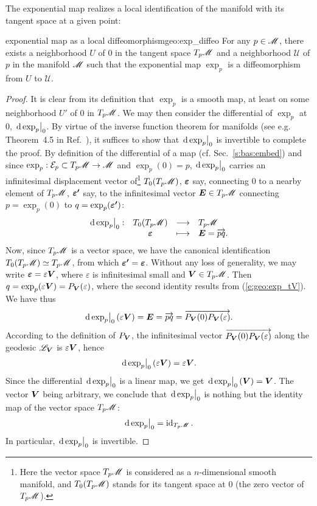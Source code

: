 The exponential map realizes a local identification of the manifold
with its tangent space at a given point:
\begin{tprop}{exponential map as a local diffeomorphism}{geo:exp_diffeo}
For any $p\in\mathscr{M}$, there exists a neighborhood $U$ of $0$ in the tangent
space $T_p\mathscr{M}$ and a neighborhood $\mathscr{U}$ of $p$ in the manifold $\mathscr{M}$
such that the exponential map $\exp_p$ is a diffeomorphism from
$U$ to $\mathscr{U}$.
\end{tprop}

\begin{proof}
It is clear from its definition that $\exp_p$ is a smooth map, at least
on some neighborhood $U'$ of $0$ in $T_p\mathscr{M}$. We may then consider the
differential of $\exp_p$ at $0$, $\left.\mathrm{d}\exp_p\right| _0$.
By virtue of the inverse function theorem for manifolds (see e.g. Theorem~4.5 in
Ref.~\cite{Lee13}), it suffices to show that
$\left.\mathrm{d}\exp_p\right| _0$ is invertible to complete the proof.
By definition of the differential of a map (cf. Sec.~\ref{s:bas:embed})
and since $\exp_p: \mathcal{E}_p \subset T_p\mathscr{M} \to \mathscr{M}$
and $\exp_p(0) = p$, $\left.\mathrm{d}\exp_p\right| _0$ carries an
infinitesimal displacement vector of\footnote{Here the vector space $T_p\mathscr{M}$ is considered
as a $n$-dimensional smooth manifold, and $T_0(T_p\mathscr{M})$ stands for its tangent space
at $0$ (the zero vector of $T_p\mathscr{M}$).} $T_0(T_p\mathscr{M})$, $\bm{\varepsilon}$ say, connecting $0$ to a nearby element of $T_p\mathscr{M}$, $\bm{\varepsilon'}$ say,
to the infinitesimal vector $\bm{E}\in T_p\mathscr{M}$ connecting
$p=\exp_p(0)$ to $q=\exp_p(\bm{\varepsilon'})$:
\[
    \begin{array}{cccl}
    \left.\mathrm{d}\exp_p\right| _0: & T_0(T_p\mathscr{M}) & \longrightarrow & T_p\mathscr{M} \\
        & \bm{\varepsilon} & \longmapsto & \bm{E} = \overrightarrow{pq}.
    \end{array}
\]
Now, since $T_p\mathscr{M}$ is a vector space, we have the canonical identification
$T_0(T_p\mathscr{M}) \simeq T_p\mathscr{M}$, from which $\bm{\varepsilon'} = \bm{\varepsilon}$.
Without any loss of generality, we may write $\bm{\varepsilon} = \varepsilon \bm{V}$,
where $\varepsilon$ is infinitesimal small and $\bm{V}\in T_p\mathscr{M}$. Then
$q = \exp_p(\varepsilon \bm{V}) = P_{\bm{V}}(\varepsilon)$, where the second
identity results from (\ref{e:geo:exp_tV}). We have thus
\[
    \left.\mathrm{d}\exp_p\right| _0(\varepsilon \bm{V}) = \bm{E} = \overrightarrow{pq} =
    \overrightarrow{P_{\bm{V}}(0) P_{\bm{V}}(\varepsilon)} .
\]
According to the definition of $P_{\bm{V}}$, the infinitesimal vector
$\overrightarrow{P_{\bm{V}}(0) P_{\bm{V}}(\varepsilon)}$ along the geodesic $\mathscr{L}_{\bm{V}}$
is $\varepsilon \bm{V}$, hence
\[
    \left.\mathrm{d}\exp_p\right| _0(\varepsilon \bm{V}) = \varepsilon \bm{V} .
\]
Since the differential $\left.\mathrm{d}\exp_p\right| _0$ is a linear map, we
get $\left.\mathrm{d}\exp_p\right| _0(\bm{V}) = \bm{V}$. The vector $\bm{V}$ being arbitrary,
we conclude that $\left.\mathrm{d}\exp_p\right| _0$ is nothing but the identity map of
the vector space $T_p\mathscr{M}$:
\[
    \left.\mathrm{d}\exp_p\right| _0 = \operatorname{id}_{T_p\mathscr{M}} .
\]
In particular, $\left.\mathrm{d}\exp_p\right| _0$ is invertible.
\end{proof}

